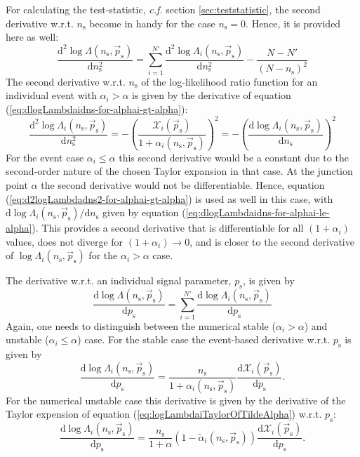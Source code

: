 \documentclass{article}
\newcommand{\ns}{n_{\mathrm{s}}}
\newcommand{\ps}{\vec{p}_{\mathrm{s}}}
\begin{document}
For calculating the test-statistic, \emph{c.f.} section \ref{sec:teststatistic},
the second derivative w.r.t. $\ns$ become in handy for the case $\ns=0$. Hence,
it is provided here as well:
\begin{equation}
 \frac{\mathrm{d}^2\log\Lambda(\ns,\ps)}{\mathrm{d} \ns^2} = \sum_{i=1}^{N'} \frac{\mathrm{d}^2 \log \Lambda_i(\ns,\ps)}{\mathrm{d} \ns^2} - \frac{N-N'}{(N - \ns)^2}
\end{equation}
The second derivative w.r.t. $\ns$ of the log-likelihood ratio function for an
individual event with $\alpha_i > \alpha$ is given by the derivative of equation
(\ref{eq:dlogLambdaidns-for-alphai-gt-alpha}):
\begin{equation}
 \frac{\mathrm{d}^2\log\Lambda_i(\ns,\ps)}{\mathrm{d} \ns^2} = - \left(\frac{\mathcal{X}_i(\ps)}{1+\alpha_i(\ns,\ps)}\right)^2 = - \left( \frac{\mathrm{d} \log \Lambda_i(\ns,\ps)}{\mathrm{d} \ns} \right)^2
 \label{eq:d2logLambdadns2-for-alphai-gt-alpha}
\end{equation}
For the event case $\alpha_i \le \alpha$ this second derivative would be a
constant due to the second-order nature of the chosen Taylor expansion in that
case. At the junction point $\alpha$ the second derivative would not be differentiable.
Hence, equation (\ref{eq:d2logLambdadns2-for-alphai-gt-alpha}) is used as well
in this case, with $\mathrm{d}\log\Lambda_i(\ns,\ps)/\mathrm{d}\ns$ given by
equation (\ref{eq:dlogLambdaidns-for-alphai-le-alpha}). This provides a second
derivative that is differentiable for all $(1 + \alpha_i)$ values, does not
diverge for $(1 + \alpha_i) \rightarrow 0$, and is closer to the second
derivative of $\log\Lambda_i(\ns,\ps)$ for the $\alpha_i > \alpha$ case.

The derivative w.r.t. an individual signal parameter, $p_{\mathrm{s}}$, is given by
\begin{equation}
 \frac{\mathrm{d} \log \Lambda(\ns,\ps)}{\mathrm{d} p_{\mathrm{s}}} = \sum_{i=1}^{N'} \frac{\mathrm{d}\log\Lambda_i(\ns,\ps)}{\mathrm{d}p_{\mathrm{s}}}
\end{equation}
Again, one needs to distinguish between the numerical stable ($\alpha_i > \alpha$)
and unstable ($\alpha_i \leq \alpha$) case.
For the stable case the event-based derivative w.r.t. $p_{\mathrm{s}}$ is given by
\begin{equation}
 \frac{\mathrm{d}\log\Lambda_i(\ns,\ps)}{\mathrm{d}p_{\mathrm{s}}} = \frac{\ns}{1+\alpha_i(\ns,\ps)} \frac{\mathrm{d}\mathcal{X}_i(\ps)}{\mathrm{d}p_{\mathrm{s}}}.
\end{equation}
For the numerical unstable case this derivative is
given by the derivative of the Taylor expension of equation (\ref{eq:logLambdaiTaylorOfTildeAlpha})
w.r.t. $p_{\mathrm{s}}$:
\begin{equation}
 \frac{\mathrm{d}\log\Lambda_i(\ns,\ps)}{\mathrm{d}p_{\mathrm{s}}} = \frac{\ns}{1+\alpha}\left(1 - \tilde{\alpha}_i(\ns,\ps)\right) \frac{\mathrm{d}\mathcal{X}_i(\ps)}{\mathrm{d}p_{\mathrm{s}}}.
\end{equation}
\end{document}
